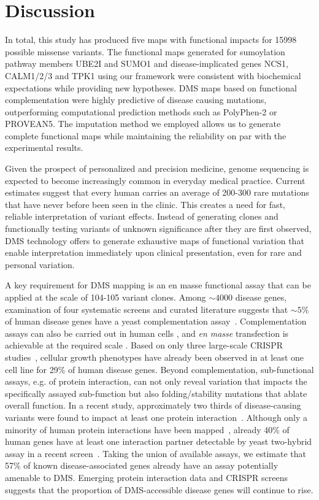 \section{Discussion}
\label{ch2discussion}

In total, this study has produced five maps with functional impacts for 15998 possible missense variants. The functional maps generated for sumoylation pathway members UBE2I and SUMO1 and disease-implicated genes NCS1, CALM1/2/3 and TPK1 using our framework were consistent with biochemical expectations while providing new hypotheses. DMS maps based on functional complementation were highly predictive of disease causing mutations, outperforming computational prediction methods such as PolyPhen-2 or PROVEAN5.  The imputation method we employed allows us to generate complete functional maps while maintaining the reliability on par with the experimental results. 

Given the prospect of personalized and precision medicine, genome sequencing is expected to become increasingly common in everyday medical practice. Current estimates suggest that every human carries an average of 200-300 rare mutations that have never before been seen in the clinic. This creates a need for fast, reliable interpretation of variant effects. Instead of generating clones and functionally testing variants of unknown significance after they are first observed, DMS technology offers to generate exhaustive maps of functional variation that enable interpretation immediately upon clinical presentation, even for rare and personal variation.

A key requirement for DMS mapping is an en masse functional assay that can be applied at the scale of 104-105 variant clones.  Among $\sim 4000$ disease genes, examination of four systematic screens and curated literature suggests that $\sim 5\%$ of human disease genes have a yeast complementation assay~\cite{hamza_complementation_2015,kachroo_systematic_2015,sun_extended_2016}. Complementation assays can also be carried out in human cells , and \textit{en masse} transfection is achievable at the required scale . Based on only three large-scale CRISPR studies~\cite{hart_high-resolution_2015,blomen_gene_2015,wang_genetic_2014}, cellular growth phenotypes have already been observed in at least one cell line for 29\% of human disease genes.  Beyond complementation, sub-functional assays, e.g. of protein interaction, can not only reveal variation that impacts the specifically assayed sub-function but also folding/stability mutations that ablate overall function. In a recent study, approximately two thirds of disease-causing variants were found to impact at least one protein interaction~\cite{sahni_widespread_2015}. Although only a minority of human protein interactions have been mapped~\cite{rolland_proteome-scale_2014}, already 40\% of human genes have at least one interaction partner detectable by yeast two-hybrid assay in a recent screen~\cite{rolland_proteome-scale_2014}. Taking the union of available assays, we estimate that 57\% of known disease-associated genes already have an assay potentially amenable to DMS. Emerging protein interaction data and CRISPR screens suggests that the proportion of DMS-accessible disease genes will continue to rise. 

